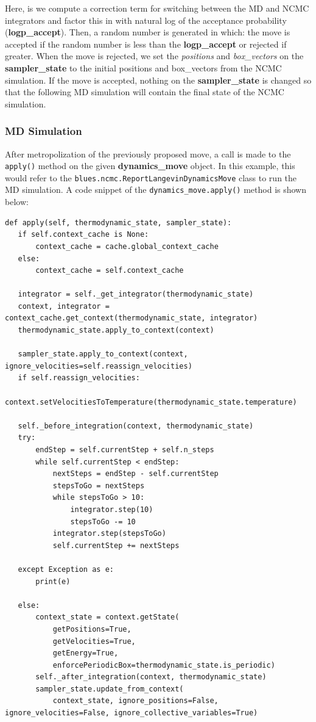 Here, is we compute a correction term for switching between the MD and NCMC integrators and factor this in with natural log of the acceptance probability (\textbf{logp\_accept}).
Then, a random number is generated in which: the move is accepted if the random number is less than the \textbf{logp\_accept} or rejected if greater.
When the move is rejected, we set the \emph{positions} and \emph{box\_vectors} on the \textbf{sampler\_state} to the initial positions and box\_vectors from the NCMC simulation.
If the move is accepted, nothing on the \textbf{sampler\_state} is changed so that the following MD simulation will contain the final state of the NCMC simulation.

\subsubsection{MD Simulation}
After metropolization of the previously proposed move, a call is made to the \texttt{apply()} method on the given \textbf{dynamics\_move} object.
In this example, this would refer to the \texttt{blues.ncmc.ReportLangevinDynamicsMove} class to run the MD simulation.
A code snippet of the \texttt{dynamics_move.apply()} method is shown below:

\begin{verbatim}
def apply(self, thermodynamic_state, sampler_state):
   if self.context_cache is None:
       context_cache = cache.global_context_cache
   else:
       context_cache = self.context_cache

   integrator = self._get_integrator(thermodynamic_state)
   context, integrator = context_cache.get_context(thermodynamic_state, integrator)
   thermodynamic_state.apply_to_context(context)

   sampler_state.apply_to_context(context, ignore_velocities=self.reassign_velocities)
   if self.reassign_velocities:
       context.setVelocitiesToTemperature(thermodynamic_state.temperature)

   self._before_integration(context, thermodynamic_state)
   try:
       endStep = self.currentStep + self.n_steps
       while self.currentStep < endStep:
           nextSteps = endStep - self.currentStep
           stepsToGo = nextSteps
           while stepsToGo > 10:
               integrator.step(10)
               stepsToGo -= 10
           integrator.step(stepsToGo)
           self.currentStep += nextSteps

   except Exception as e:
       print(e)

   else:
       context_state = context.getState(
           getPositions=True,
           getVelocities=True,
           getEnergy=True,
           enforcePeriodicBox=thermodynamic_state.is_periodic)
       self._after_integration(context, thermodynamic_state)
       sampler_state.update_from_context(
           context_state, ignore_positions=False, ignore_velocities=False, ignore_collective_variables=True)

\end{verbatim}

